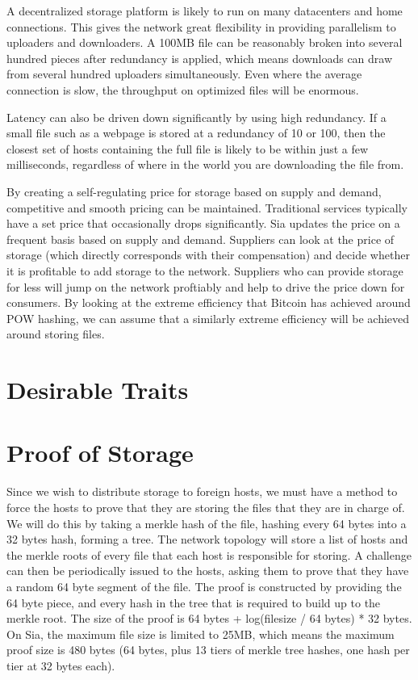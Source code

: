 \documentclass[twocolumn]{article}
\begin{document}
A decentralized storage platform is likely to run on many datacenters and home connections.
This gives the network great flexibility in providing parallelism to uploaders and downloaders.
A 100MB file can be reasonably broken into several hundred pieces after redundancy is applied, which means downloads can draw from several hundred uploaders simultaneously.
Even where the average connection is slow, the throughput on optimized files will be enormous.

Latency can also be driven down significantly by using high redundancy.
If a small file such as a webpage is stored at a redundancy of 10 or 100, then the closest set of hosts containing the full file is likely to be within just a few milliseconds, regardless of where in the world you are downloading the file from.

By creating a self-regulating price for storage based on supply and demand, competitive and smooth pricing can be maintained.
Traditional services typically have a set price that occasionally drops significantly.
Sia updates the price on a frequent basis based on supply and demand.
Suppliers can look at the price of storage (which directly corresponds with their compensation) and decide whether it is profitable to add storage to the network.
Suppliers who can provide storage for less will jump on the network proftiably and help to drive the price down for consumers.
By looking at the extreme efficiency that Bitcoin has achieved around POW hashing, we can assume that a similarly extreme efficiency will be achieved around storing files.

\section{Desirable Traits}

\section{Proof of Storage}
Since we wish to distribute storage to foreign hosts, we must have a method to force the hosts to prove that they are storing the files that they are in charge of.
We will do this by taking a merkle hash of the file, hashing every 64 bytes into a 32 bytes hash, forming a tree.
The network topology will store a list of hosts and the merkle roots of every file that each host is responsible for storing.
A challenge can then be periodically issued to the hosts, asking them to prove that they have a random 64 byte segment of the file.
The proof is constructed by providing the 64 byte piece, and every hash in the tree that is required to build up to the merkle root.
The size of the proof is 64 bytes + log(filesize / 64 bytes) * 32 bytes.
On Sia, the maximum file size is limited to 25MB, which means the maximum proof size is 480 bytes (64 bytes, plus 13 tiers of merkle tree hashes, one hash per tier at 32 bytes each).
\end{document}
